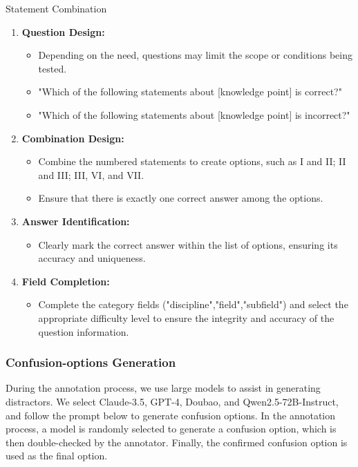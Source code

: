 \begin{methodbox}{Statement Combination}
\begin{enumerate}
\begin{itemize}
    \end{itemize}
    \item \textbf{Question Design:}
    \begin{itemize}
        \item Depending on the need, questions may limit the scope or conditions being tested.
        \item "Which of the following statements about [knowledge point] is correct?"
        \item "Which of the following statements about [knowledge point] is incorrect?"
    \end{itemize}
    \item \textbf{Combination Design:}
    \begin{itemize}
        \item Combine the numbered statements to create options, such as I and II; II and III; III, VI, and VII.
        \item Ensure that there is exactly one correct answer among the options.
    \end{itemize}
    \item \textbf{Answer Identification:}
    \begin{itemize}
        \item Clearly mark the correct answer within the list of options, ensuring its accuracy and uniqueness.
    \end{itemize}
    \item \textbf{Field Completion:}
    \begin{itemize}
        \item Complete the category fields ("discipline","field","subfield") and select the appropriate difficulty level to ensure the integrity and accuracy of the question information.
    \end{itemize}
\end{enumerate}
\end{methodbox}
\subsubsection{Confusion-options Generation}
During the annotation process, we use large models to assist in generating distractors. We select Claude-3.5, GPT-4, Doubao, and Qwen2.5-72B-Instruct, and follow the prompt below to generate confusion options. In the annotation process, a model is randomly selected to generate a confusion option, which is then double-checked by the annotator. Finally, the confirmed confusion option is used as the final option.

